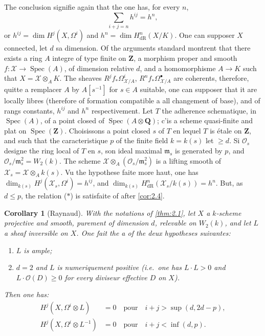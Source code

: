 \documentclass[12pt,a4paper]{article}
\theoremstyle{plain}
\newtheorem{corollary}[theorem]{Corollary}
\theoremstyle{definition}
\theoremstyle{remark}
\DeclareMathOperator{\Spec}{Spec}
\newcommand{\cO}{\mathcal{O}}
\newcommand{\dR}{\text{dR}}
\begin{document}
The conclusion signifie again that the one has, for every $n$,
\begin{equation}\label{eq:star2}
\sum_{i+j=n} h^{ij} = h^n,
\tag{$*$}
\end{equation}
or $h^{ij} = \dim H^j(X, \Omega^i)$ and $h^n = \dim H^n_{\dR}(X/K)$. One can supposer $X$ connected, let $d$ sa dimension. Of the arguments standard montrent that there exists a ring $A$ integre of type finite on $\mathbf{Z}$, a morphism proper and smooth $f: \mathscr{X} \to \Spec(A)$, of dimension relative $d$, and a homomorphisme $A \to K$ such that $X = \mathscr{X} \otimes_A K$. The sheaves $R^j f_* \Omega^i_{\mathscr{X}/A}$, $R^n f_* \Omega^{\bullet}_{\mathscr{X}/A}$ are coherents, therefore, quitte a remplacer $A$ by $A[s^{-1}]$ for $s \in A$ suitable, one can supposer that it are locally libres (therefore of formation compatible a all changement of base), and of rangs constants, $h^{ij}$ and $h^n$ respectivement. Let $T$ the adherence schematique, in $\Spec(A)$, of a point closed of $\Spec(A \otimes \mathbf{Q})$; c'is a scheme quasi-finite and plat on $\Spec(\mathbf{Z})$. Choisissons a point closed $s$ of $T$ en lequel $T$ is étale on $\mathbf{Z}$, and such that the caracteristique $p$ of the finite field $k = k(s)$ let $\ge d$. Si $\cO_s$ designe the ring local of $T$ en $s$, son ideal maximal $\mathfrak{m}_s$ is generated by $p$, and $\cO_s/\mathfrak{m}_s^2 = W_2(k)$. The scheme $\mathscr{X} \otimes_A (\cO_s/\mathfrak{m}_s^2)$ is a lifting smooth of $\mathscr{X}_s = \mathscr{X} \otimes_A k(s)$. Vu the hypothese faite more haut, one has $\dim_{k(s)} H^j(\mathscr{X}_s, \Omega^i) = h^{ij}$, and $\dim_{k(s)} H^n_{\dR}(\mathscr{X}_s/k(s)) = h^n$. But, as $d \le p$, the relation ($*$) is satisfaite of after \ref{cor:2.4}.

\begin{corollary}[Raynaud]\label{cor:2.8}
With the notations of \ref{thm:2.1}, let $X$ a $k$-scheme projective and smooth, purement of dimension $d$, relevable on $W_2(k)$, and let $L$ a sheaf inversible on $X$. One fait the a of the deux hypotheses suivantes:
\begin{enumerate}[label=(\roman*)]
\item $L$ is ample;
\item $d = 2$ and $L$ is numeriquement positive (i.e.~one has $L \cdot L > 0$ and $L \cdot \cO(D) \ge 0$ for every diviseur effective $D$ on $X$).
\end{enumerate}
Then one has:
\begin{align}
H^j(X, \Omega^i \otimes L) &= 0 \quad \text{pour} \quad i + j > \sup(d, 2d - p), \label{eq:2.8.1} \\
H^j(X, \Omega^i \otimes L^{-1}) &= 0 \quad \text{pour} \quad i + j < \inf(d, p). \label{eq:2.8.2}
\end{align}
\end{corollary}
\end{document}
